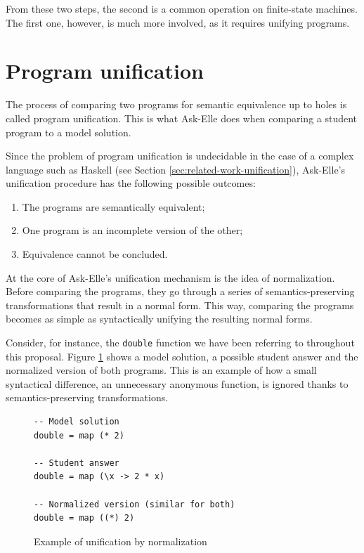 From these two steps, the second is a common operation on finite-state machines. The first one, however, is much more involved, as it requires unifying programs.

\section{Program unification}

The process of comparing two programs for semantic equivalence up to holes is called program unification. This is what Ask-Elle does when comparing a student program to a model solution.

Since the problem of program unification is undecidable in the case of a complex language such as Haskell (see Section \ref{sec:related-work-unification}), Ask-Elle's unification procedure has the following possible outcomes:

\begin{enumerate}
    \item The programs are semantically equivalent;
    \item One program is an incomplete version of the other;
    \item Equivalence cannot be concluded.
\end{enumerate}

At the core of Ask-Elle's unification mechanism is the idea of normalization. Before comparing the programs, they go through a series of semantics-preserving transformations that result in a normal form. This way, comparing the programs becomes as simple as syntactically unifying the resulting normal forms.

Consider, for instance, the \texttt{double} function we have been referring to throughout this proposal. Figure \ref{fig:bg-unification-normalization} shows a model solution, a possible student answer and the normalized version of both programs. This is an example of how a small syntactical difference, an unnecessary anonymous function, is ignored thanks to semantics-preserving transformations.

\begin{figure}[H]
\begin{verbatim}
-- Model solution
double = map (* 2)

-- Student answer
double = map (\x -> 2 * x)

-- Normalized version (similar for both)
double = map ((*) 2)
\end{verbatim}
\caption{Example of unification by normalization}
\label{fig:bg-unification-normalization}
\end{figure}
